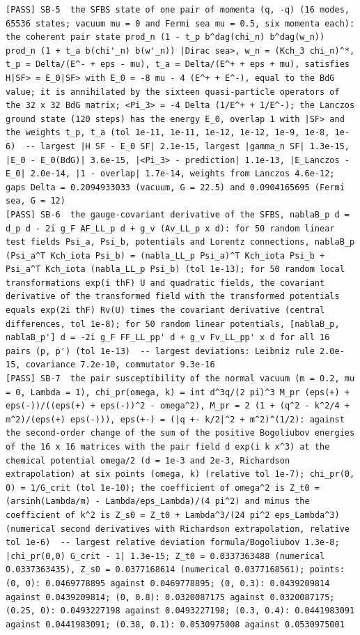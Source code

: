 \documentclass[
  10pt,
]{article}
\begin{document}
\begin{verbatim}
[PASS] SB-5  the SFBS state of one pair of momenta (q, -q) (16 modes, 65536 states; vacuum mu = 0 and Fermi sea mu = 0.5, six momenta each): the coherent pair state prod_n (1 - t_p b^dag(chi_n) b^dag(w_n)) prod_n (1 + t_a b(chi'_n) b(w'_n)) |Dirac sea>, w_n = (Kch_3 chi_n)^*, t_p = Delta/(E^- + eps - mu), t_a = Delta/(E^+ + eps + mu), satisfies H|SF> = E_0|SF> with E_0 = -8 mu - 4 (E^+ + E^-), equal to the BdG value; it is annihilated by the sixteen quasi-particle operators of the 32 x 32 BdG matrix; <Pi_3> = -4 Delta (1/E^+ + 1/E^-); the Lanczos ground state (120 steps) has the energy E_0, overlap 1 with |SF> and the weights t_p, t_a (tol 1e-11, 1e-11, 1e-12, 1e-12, 1e-9, 1e-8, 1e-6)  -- largest |H SF - E_0 SF| 2.1e-15, largest |gamma_n SF| 1.3e-15, |E_0 - E_0(BdG)| 3.6e-15, |<Pi_3> - prediction| 1.1e-13, |E_Lanczos - E_0| 2.0e-14, |1 - overlap| 1.7e-14, weights from Lanczos 4.6e-12; gaps Delta = 0.2094933033 (vacuum, G = 22.5) and 0.0904165695 (Fermi sea, G = 12)
[PASS] SB-6  the gauge-covariant derivative of the SFBS, nablaB_p d = d_p d - 2i g_F AF_LL_p d + g_v (Av_LL_p x d): for 50 random linear test fields Psi_a, Psi_b, potentials and Lorentz connections, nablaB_p (Psi_a^T Kch_iota Psi_b) = (nabla_LL_p Psi_a)^T Kch_iota Psi_b + Psi_a^T Kch_iota (nabla_LL_p Psi_b) (tol 1e-13); for 50 random local transformations exp(i thF) U and quadratic fields, the covariant derivative of the transformed field with the transformed potentials equals exp(2i thF) Rv(U) times the covariant derivative (central differences, tol 1e-8); for 50 random linear potentials, [nablaB_p, nablaB_p'] d = -2i g_F FF_LL_pp' d + g_v Fv_LL_pp' x d for all 16 pairs (p, p') (tol 1e-13)  -- largest deviations: Leibniz rule 2.0e-15, covariance 7.2e-10, commutator 9.3e-16
[PASS] SB-7  the pair susceptibility of the normal vacuum (m = 0.2, mu = 0, Lambda = 1), chi_pr(omega, k) = int d^3q/(2 pi)^3 M_pr (eps(+) + eps(-))/((eps(+) + eps(-))^2 - omega^2), M_pr = 2 (1 + (q^2 - k^2/4 + m^2)/(eps(+) eps(-))), eps(+-) = (|q +- k/2|^2 + m^2)^(1/2): against the second-order change of the sum of the positive Bogoliubov energies of the 16 x 16 matrices with the pair field d exp(i k x^3) at the chemical potential omega/2 (d = 1e-3 and 2e-3, Richardson extrapolation) at six points (omega, k) (relative tol 1e-7); chi_pr(0, 0) = 1/G_crit (tol 1e-10); the coefficient of omega^2 is Z_t0 = (arsinh(Lambda/m) - Lambda/eps_Lambda)/(4 pi^2) and minus the coefficient of k^2 is Z_s0 = Z_t0 + Lambda^3/(24 pi^2 eps_Lambda^3) (numerical second derivatives with Richardson extrapolation, relative tol 1e-6)  -- largest relative deviation formula/Bogoliubov 1.3e-8; |chi_pr(0,0) G_crit - 1| 1.3e-15; Z_t0 = 0.0337363488 (numerical 0.0337363435), Z_s0 = 0.0377168614 (numerical 0.0377168561); points: (0, 0): 0.0469778895 against 0.0469778895; (0, 0.3): 0.0439209814 against 0.0439209814; (0, 0.8): 0.0320087175 against 0.0320087175; (0.25, 0): 0.0493227198 against 0.0493227198; (0.3, 0.4): 0.0441983091 against 0.0441983091; (0.38, 0.1): 0.0530975008 against 0.0530975001

\end{verbatim}
\end{document}
